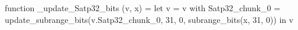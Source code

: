 function _update_Satp32_bits (v, x) = let v = { v with Satp32_chunk_0 = update_subrange_bits(v.Satp32_chunk_0, 31, 0, subrange_bits(x, 31, 0)) } in
  v
